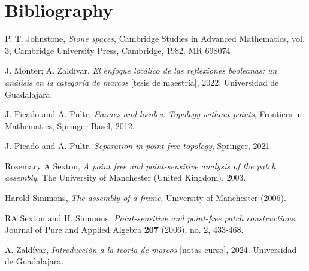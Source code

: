 \chapter*{Bibliography}

\begin{thebibliography}{20}

 P. T. Johnstone, \textit{Stone spaces}, Cambridge Studies in Advanced Mathematics, vol. 3, Cambridge University Press, Cambridge, 1982. MR 698074


 J. Monter; A. Zaldívar, \textit{El enfoque locálico de las reflexiones booleanas: un análisis en la categoría de marcos} [tesis de maestría], 2022. Universidad de Guadalajara.

 J. Picado and A. Pultr, \textit{Frames and locales: Topology without points}, Frontiers in Mathematics, Springer Basel, 2012.

 J. Picado and A. Pultr, \textit{Separation in point-free topology}, Springer, 2021.

 Rosemary A Sexton, \textit{A point free and point-sensitive analysis of the patch assembly}, The University of Manchester (United Kingdom), 2003.

 Harold Simmons, \textit{The assembly of a frame}, University of Manchester (2006).

 RA Sexton and H. Simmons, \textit{Point-sensitive and point-free patch constructions}, Journal of Pure and Applied Algebra \textbf{207} (2006), no. 2, 433-468.

 A. Zaldívar, \textit{Introducción a la teoría de marcos} [notas curso], 2024. Universidad de Guadalajara.

\end{thebibliography}
